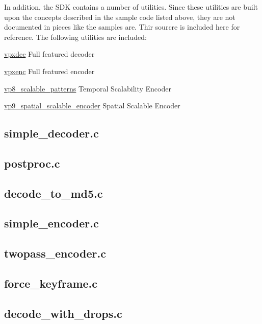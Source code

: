 In addition, the S\+D\+K contains a number of utilities. Since these utilities are built upon the concepts described in the sample code listed above, they are not documented in pieces like the samples are. Thir sourcre is included here for reference. The following utilities are included\+:
\begin{DoxyItemize}
\item \hyperlink{example_vpxdec}{vpxdec} Full featured decoder
\item \hyperlink{example_vpxenc}{vpxenc} Full featured encoder
\item \hyperlink{example_vp8_scalable_patterns}{vp8\+\_\+scalable\+\_\+patterns} Temporal Scalability Encoder
\item \hyperlink{example_vp9_spatial_scalable_encoder}{vp9\+\_\+spatial\+\_\+scalable\+\_\+encoder} Spatial Scalable Encoder 
\end{DoxyItemize}\hypertarget{example_simple_decoder}{}\subsection{simple\+\_\+decoder.\+c}\label{example_simple_decoder}
 \hypertarget{example_postproc}{}\subsection{postproc.\+c}\label{example_postproc}
 \hypertarget{example_decode_to_md5}{}\subsection{decode\+\_\+to\+\_\+md5.\+c}\label{example_decode_to_md5}
 \hypertarget{example_simple_encoder}{}\subsection{simple\+\_\+encoder.\+c}\label{example_simple_encoder}
 \hypertarget{example_twopass_encoder}{}\subsection{twopass\+\_\+encoder.\+c}\label{example_twopass_encoder}
 \hypertarget{example_force_keyframe}{}\subsection{force\+\_\+keyframe.\+c}\label{example_force_keyframe}
 \hypertarget{example_decode_with_drops}{}\subsection{decode\+\_\+with\+\_\+drops.\+c}\label{example_decode_with_drops}
